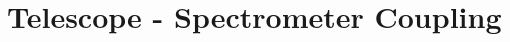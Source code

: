 \chapter{Telescope - Spectrometer Coupling}
\label{ap:technical_drawing_telescope_spectrometer_coupling}

\missingfigure{}
